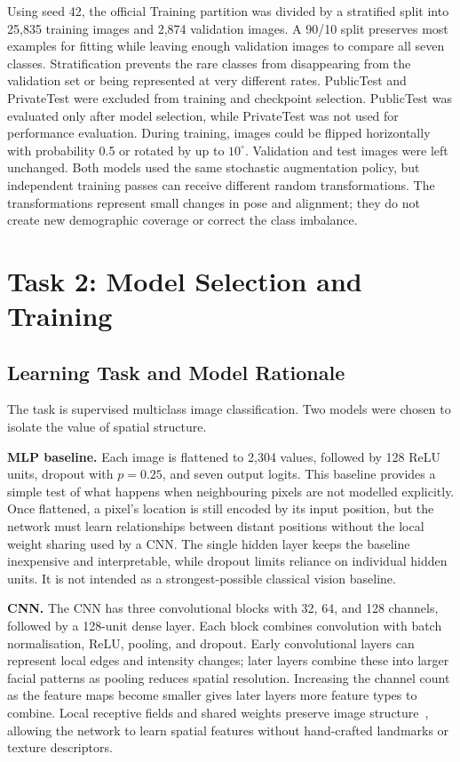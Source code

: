 \documentclass[10pt,twocolumn]{article}
\newcommand{\task}[1]{\section{Task #1}}
\begin{document}
Using seed 42, the official Training partition was divided by a stratified split into 25,835 training images and 2,874 validation images. A 90/10 split preserves most examples for fitting while leaving enough validation images to compare all seven classes. Stratification prevents the rare classes from disappearing from the validation set or being represented at very different rates. PublicTest and PrivateTest were excluded from training and checkpoint selection. PublicTest was evaluated only after model selection, while PrivateTest was not used for performance evaluation. During training, images could be flipped horizontally with probability 0.5 or rotated by up to $10^{\circ}$. Validation and test images were left unchanged. Both models used the same stochastic augmentation policy, but independent training passes can receive different random transformations. The transformations represent small changes in pose and alignment; they do not create new demographic coverage or correct the class imbalance.

\task{2: Model Selection and Training}

\subsection{Learning Task and Model Rationale}

The task is supervised multiclass image classification. Two models were chosen to isolate the value of spatial structure.

\textbf{MLP baseline.} Each image is flattened to 2,304 values, followed by 128 ReLU units, dropout with $p=0.25$, and seven output logits. This baseline provides a simple test of what happens when neighbouring pixels are not modelled explicitly. Once flattened, a pixel's location is still encoded by its input position, but the network must learn relationships between distant positions without the local weight sharing used by a CNN. The single hidden layer keeps the baseline inexpensive and interpretable, while dropout limits reliance on individual hidden units. It is not intended as a strongest-possible classical vision baseline.

\textbf{CNN.} The CNN has three convolutional blocks with 32, 64, and 128 channels, followed by a 128-unit dense layer. Each block combines convolution with batch normalisation, ReLU, pooling, and dropout. Early convolutional layers can represent local edges and intensity changes; later layers combine these into larger facial patterns as pooling reduces spatial resolution. Increasing the channel count as the feature maps become smaller gives later layers more feature types to combine. Local receptive fields and shared weights preserve image structure~\cite{lecun1998}, allowing the network to learn spatial features without hand-crafted landmarks or texture descriptors.
\end{document}
